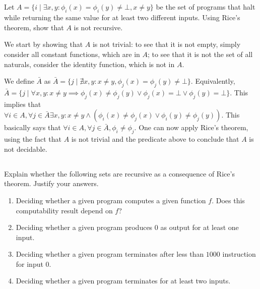 \subsection{} %
Let \(A = \{i \mid \exists x, y : \phi_i(x) = \phi_i(y) \ne \bot, x \ne y\}\)
be the set of programs that halt while returning the same value
for at least two different inputs.
Using Rice's theorem, show that \(A\) is not recursive.

\begin{solution}
	We start by showing that \(A\) is not trivial:
	to see that it is not empty, simply consider all constant functions,
	which are in \(A\);
	to see that it is not the set of all naturals,
	consider the identity function,
	which is not in \(A\).

	We define \(\bar{A}\) as
	\(\bar{A} = \{j \mid \nexists x, y :
	x \ne y, \phi_j(x) = \phi_j(y) \ne \bot\}\).
	Equivalently,
	\(\bar{A} = \{j \mid \forall x, y :
	x \ne y \implies \phi_j(x) \ne \phi_j(y)
	\lor \phi_j(x) = \bot \lor \phi_j(y) = \bot\}\).
	This implies that
	\(\forall i \in A, \forall j \in \bar{A} \exists x, y :
	x \ne y \land (\phi_i(x) \ne \phi_j(x) \lor \phi_i(y) \ne \phi_j(y))\).
	This basically says that
	\(\forall i \in A, \forall j \in \bar{A}, \phi_i \ne \phi_j\).
	One can now apply Rice's theorem,
	using the fact that \(A\) is not trivial
	and the predicate above
	to conclude that \(A\) is not decidable.
\end{solution}

\subsection{} %
Explain whether the following sets are recursive
as a consequence of Rice's theorem.
Justify your answers.
\begin{enumerate}
	\item Deciding whether a given program computes a given function \(f\).
	Does this computability result depend on \(f\)?
	\item Deciding whether a given program produces \(0\) as output
	for at least one input.
	\item Deciding whether a given program terminates
	after less than \(1000\) instruction for input \(0\).
	\item Deciding whether a given program terminates
	for at least two inputs.
\end{enumerate}

